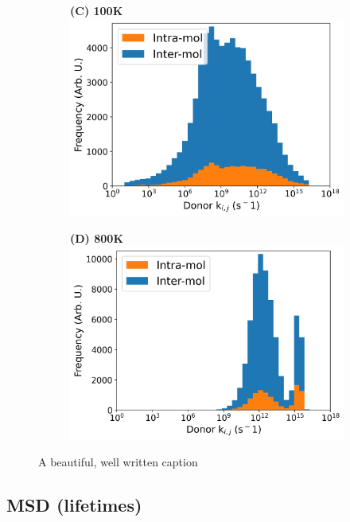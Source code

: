 \begin{figure}[]
\begin{subfigure}{.5\textwidth}
    \newline
\end{subfigure}
\begin{subfigure}{.5\textwidth}
    \textbf{(C) 100K}
    \centering
    \includegraphics[width=\textwidth]{figures/donor_hopping_rate_clusters_temp100.png}
\end{subfigure}%
\begin{subfigure}{.5\textwidth}
    \textbf{(D) 800K}
    \centering
    \includegraphics[width=\textwidth]{figures/donor_hopping_rate_clusters_temp800.png}
\end{subfigure}
\caption[short]{A beautiful, well written caption}
\label{TEMP}
\end{figure}

\subsection{MSD (lifetimes)}

